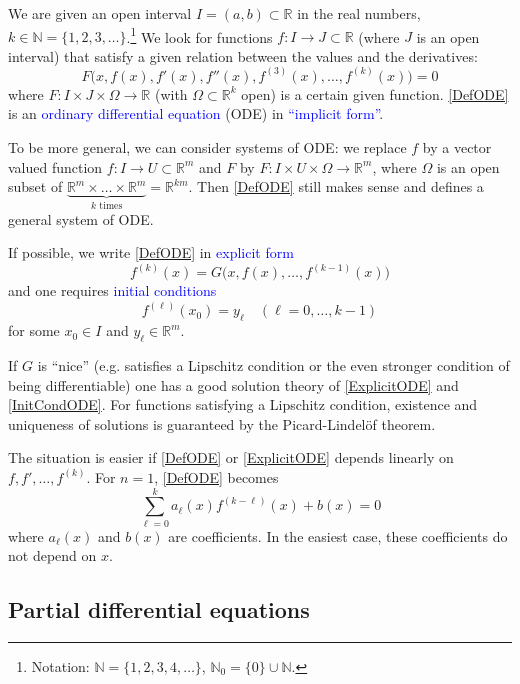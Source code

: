 \documentclass[12pt, oneside, a4paper]{article}
\theoremstyle{dfn}
\def\Nbb{\mathbb{N}}
\def\Rbb{\ensuremath{\mathbb{R}}}
\begin{document}
We are given an open interval $I = (a,b) \subset \Rbb$ in the real numbers, $k \in \Nbb = \{1,2,3,\ldots\}$.\footnote{Notation: $\Nbb = \{1,2,3,4,\ldots\}$, $\Nbb_0 = \{0\} \cup \Nbb$.} We look for functions $f: I \to J \subset \Rbb$ (where $J$ is an open interval) that satisfy a given relation between the values and the derivatives:
\begin{equation}
F\big(x, f(x), f'(x), f''(x), f^{(3)}(x), \ldots, f^{(k)}(x)\big) = 0
\label{DefODE}
\end{equation}
where $F: I \times J \times \Omega \to \Rbb$ (with $\Omega \subset \Rbb^k$ open) is a certain given function. \eqref{DefODE} is an \textcolor{blue}{ordinary differential equation} (ODE) in \textcolor{blue}{``implicit form''}.

To be more general, we can consider systems of ODE: we replace $f$ by a vector valued function $f: I \to U \subset \Rbb^m$ and $F$ by $F: I \times U \times \Omega \to \Rbb^m$, where $\Omega$ is an open subset of $\underbrace{\Rbb^m \times \dots \times \Rbb^m}_{\text{$k$ times}} = \Rbb^{km}$. Then \eqref{DefODE} still makes sense and defines a general system of ODE.

If possible, we write \eqref{DefODE} in \textcolor{blue}{explicit form}
\begin{equation}
f^{(k)}(x) = G\big(x, f(x), \ldots, f^{(k-1)}(x)\big)
\label{ExplicitODE}
\end{equation}
and one requires \textcolor{blue}{initial conditions}
\begin{equation}
f^{(\ell)}(x_0) = y_\ell \quad (\ell = 0, \ldots, k-1)
\label{InitCondODE}
\end{equation}
for some $x_0 \in I$ and $y_\ell \in \Rbb^m$.

If $G$ is ``nice'' (e.g. satisfies a Lipschitz condition or the even stronger condition of being differentiable) one has a good solution theory of \eqref{ExplicitODE} and \eqref{InitCondODE}. For functions satisfying a Lipschitz condition, existence and uniqueness of solutions is guaranteed by the Picard-Lindelöf theorem.

The situation is easier if \eqref{DefODE} or \eqref{ExplicitODE} depends linearly on $f, f', \ldots, f^{(k)}$. For $n=1$, \eqref{DefODE} becomes
\[
\sum_{\ell=0}^k a_\ell(x) f^{(k - \ell)} (x) + b(x) = 0
\]
where $a_\ell(x)$ and $b(x)$ are coefficients. In the easiest case, these coefficients do not depend on $x$.

\subsection*{Partial differential equations}
\end{document}
